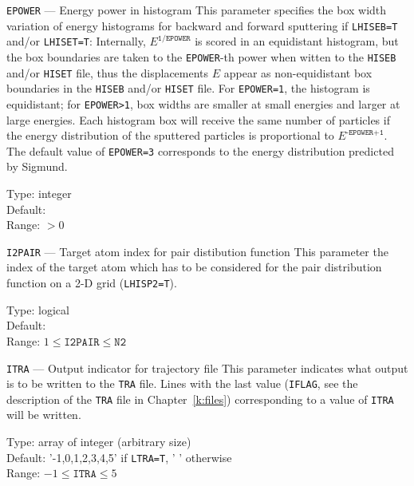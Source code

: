 \begin{keydescription}{\texttt{EPOWER} --- Energy power in histogram}
%
  This parameter specifies the box width variation of energy histograms for backward and 
  forward sputtering if \texttt{LHISEB=T} and/or \texttt{LHISET=T}: Internally, 
  $E^\texttt{1/EPOWER}$ is scored in an equidistant histogram, but the box boundaries are 
  taken to the \texttt{EPOWER}-th power when witten to the \texttt{HISEB} and/or \texttt{HISET} 
  file, thus the displacements $E$ appear as non-equidistant box boundaries in the 
  \texttt{HISEB} and/or \texttt{HISET} file. For \texttt{EPOWER=1}, the histogram is 
  equidistant; for \texttt{EPOWER>1}, box widths are smaller at small energies and larger at 
  large energies. Each histogram box will receive the same number of particles if the energy 
  distribution of the sputtered particles is proportional to $E^\texttt{-EPOWER+1}$. The 
  default value of \texttt{EPOWER=3} corresponds to the energy distribution predicted by 
  Sigmund. 
  \begin{keytab}
    Type:    \> integer \\
    Default:   \\
    Range:   \> $>0$
  \end{keytab}
\end{keydescription}

\ifprivate
\begin{keydescription}{\texttt{I2PAIR} --- Target atom index for pair distibution function}
%
  This parameter the index of the target atom which has to be considered for the pair 
  distribution function on a 2-D grid (\texttt{LHISP2=T}).
  \begin{keytab}
    Type:    \> logical \\
    Default:  \\
    Range:   \> $1 \le \texttt{I2PAIR} \le \texttt{N2}$
  \end{keytab}
\end{keydescription}
\fi

\begin{keydescription}{\texttt{ITRA} --- Output indicator for trajectory file}
%
  This parameter indicates what output is to be written to the \texttt{TRA} file. Lines with 
  the last value (\texttt{IFLAG}, see the description of the \texttt{TRA} file
  in Chapter~\ref{k:files}) corresponding to a value of \texttt{ITRA} will be written.
  \begin{keytab}
    Type:    \> array of integer (arbitrary size) \\
    Default: \> '-1,0,1,2,3,4,5' if \texttt{LTRA=T}, ' ' otherwise \\
    Range:   \> $-1 \le \texttt{ITRA} \le 5$
  \end{keytab}
\end{keydescription}

